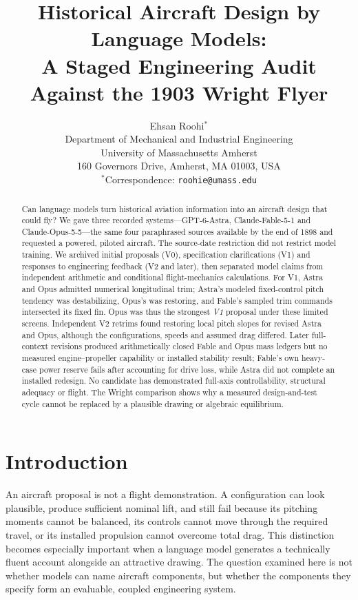 \documentclass[11pt,a4paper]{article}
\title{Historical Aircraft Design by Language Models:\\A Staged Engineering Audit Against the 1903 Wright Flyer}
\author{Ehsan Roohi$^{*}$\\
\small Department of Mechanical and Industrial Engineering\\
\small University of Massachusetts Amherst\\
\small 160 Governors Drive, Amherst, MA 01003, USA\\
\small $^{*}$Correspondence: \texttt{roohie@umass.edu}}
\date{}
\begin{document}
\maketitle

\begin{abstract}
Can language models turn historical aviation information into an aircraft design that could fly? We gave three recorded systems---GPT-6-Astra, Claude-Fable-5-1 and Claude-Opus-5-5---the same four paraphrased sources available by the end of 1898 and requested a powered, piloted aircraft. The source-date restriction did not restrict model training. We archived initial proposals (V0), specification clarifications (V1) and responses to engineering feedback (V2 and later), then separated model claims from independent arithmetic and conditional flight-mechanics calculations. For V1, Astra and Opus admitted numerical longitudinal trim; Astra's modeled fixed-control pitch tendency was destabilizing, Opus's was restoring, and Fable's sampled trim commands intersected its fixed fin. Opus was thus the strongest \emph{V1} proposal under these limited screens. Independent V2 retrims found restoring local pitch slopes for revised Astra and Opus, although the configurations, speeds and assumed drag differed. Later full-context revisions produced arithmetically closed Fable and Opus mass ledgers but no measured engine--propeller capability or installed stability result; Fable's own heavy-case power reserve fails after accounting for drive loss, while Astra did not complete an installed redesign. No candidate has demonstrated full-axis controllability, structural adequacy or flight. The Wright comparison shows why a measured design-and-test cycle cannot be replaced by a plausible drawing or algebraic equilibrium.
\end{abstract}

\section{Introduction}
An aircraft proposal is not a flight demonstration. A configuration can look plausible, produce sufficient nominal lift, and still fail because its pitching moments cannot be balanced, its controls cannot move through the required travel, or its installed propulsion cannot overcome total drag. This distinction becomes especially important when a language model generates a technically fluent account alongside an attractive drawing. The question examined here is not whether models can name aircraft components, but whether the components they specify form an evaluable, coupled engineering system.
\end{document}
